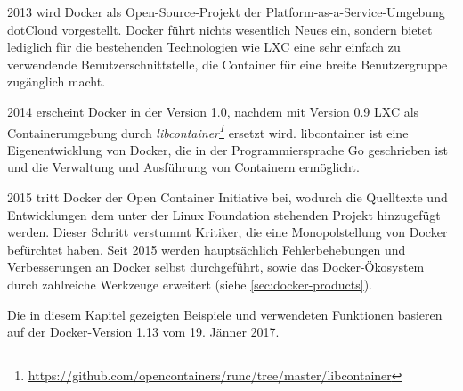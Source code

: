 2013 wird Docker als Open-Source-Projekt der Platform-as-a-Service-Umgebung dotCloud vorgestellt.
Docker führt nichts wesentlich Neues ein, sondern bietet lediglich für die bestehenden Technologien wie LXC eine sehr einfach zu verwendende Benutzerschnittstelle, die Container für eine breite Benutzergruppe zugänglich macht.

2014 erscheint Docker in der Version 1.0, nachdem mit Version 0.9 LXC als Containerumgebung durch \emph{libcontainer\footnote{\url{https://github.com/opencontainers/runc/tree/master/libcontainer}}} ersetzt wird.
libcontainer ist eine Eigenentwicklung von Docker, die in der Programmiersprache Go geschrieben ist und die Verwaltung und Ausführung von Containern ermöglicht.

2015 tritt Docker der Open Container Initiative bei, wodurch die Quelltexte und Entwicklungen dem unter der Linux Foundation stehenden Projekt hinzugefügt werden.
Dieser Schritt verstummt Kritiker, die eine Monopolstellung von Docker befürchtet haben.
Seit 2015 werden hauptsächlich Fehlerbehebungen und Verbesserungen an Docker selbst durchgeführt, sowie das Docker-Ökosystem durch zahlreiche Werkzeuge erweitert (siehe \cref{sec:docker-products}).

Die in diesem Kapitel gezeigten Beispiele und verwendeten Funktionen basieren auf der Docker-Version 1.13 vom 19. Jänner 2017.
